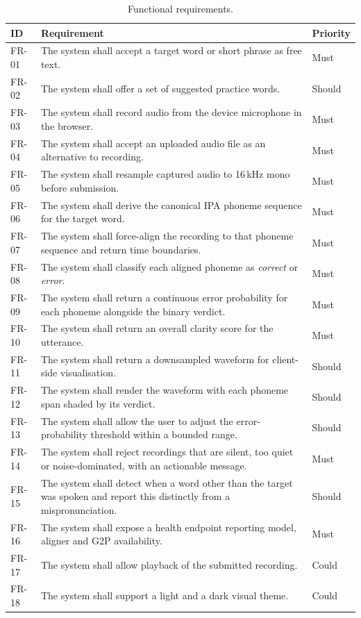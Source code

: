 \begin{table}[H]
\centering
\caption[Functional requirements]{Functional requirements.}
\label{tab:fr}
\small
\begin{tabularx}{\textwidth}{@{}p{1.1cm}Xp{1.5cm}@{}}
\toprule
\textbf{ID} & \textbf{Requirement} & \textbf{Priority} \\
\midrule
FR-01 & The system shall accept a target word or short phrase as free text. & Must \\
FR-02 & The system shall offer a set of suggested practice words. & Should \\
FR-03 & The system shall record audio from the device microphone in the browser. & Must \\
FR-04 & The system shall accept an uploaded audio file as an alternative to recording. & Must \\
FR-05 & The system shall resample captured audio to 16\,kHz mono before submission. & Must \\
FR-06 & The system shall derive the canonical IPA phoneme sequence for the target word. & Must \\
FR-07 & The system shall force-align the recording to that phoneme sequence and return time boundaries. & Must \\
FR-08 & The system shall classify each aligned phoneme as \emph{correct} or \emph{error}. & Must \\
FR-09 & The system shall return a continuous error probability for each phoneme alongside the binary verdict. & Must \\
FR-10 & The system shall return an overall clarity score for the utterance. & Must \\
FR-11 & The system shall return a downsampled waveform for client-side visualisation. & Should \\
FR-12 & The system shall render the waveform with each phoneme span shaded by its verdict. & Should \\
FR-13 & The system shall allow the user to adjust the error-probability threshold within a bounded range. & Should \\
FR-14 & The system shall reject recordings that are silent, too quiet or noise-dominated, with an actionable message. & Must \\
FR-15 & The system shall detect when a word other than the target was spoken and report this distinctly from a mispronunciation. & Should \\
FR-16 & The system shall expose a health endpoint reporting model, aligner and G2P availability. & Must \\
FR-17 & The system shall allow playback of the submitted recording. & Could \\
FR-18 & The system shall support a light and a dark visual theme. & Could \\
\bottomrule
\end{tabularx}
\end{table}

